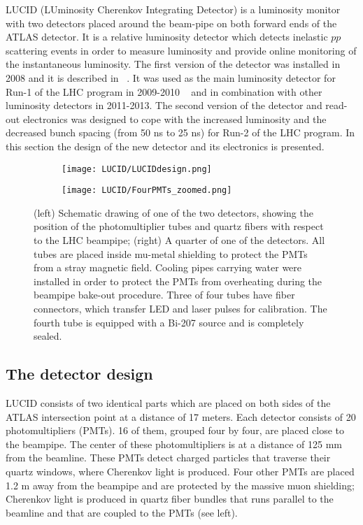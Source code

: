 LUCID (LUminosity Cherenkov Integrating Detector) is a luminosity monitor with two detectors placed around the beam-pipe on both forward ends of the ATLAS detector.
It is a relative luminosity detector which detects inelastic $pp$ scattering events in order to measure luminosity and provide online monitoring of the instantaneous luminosity.
The first version of the detector was installed in 2008 and it is described in ~\cite{Aad:2008zzm}.
It was used as the main luminosity detector for Run-1 of the LHC program in 2009-2010 ~\cite{Aad:2013ucp} and in combination with other luminosity detectors in 2011-2013.
The second version of the detector and read-out electronics was designed to cope with 
the increased luminosity and the decreased bunch spacing (from 50 ns to 25 ns) for Run-2 of the LHC program.
In this section the design of the new detector and its electronics is presented. 

\begin{figure}
\centering
\begin{subfigure}{.5\textwidth}
  \centering
  \texttt{[image: LUCID/LUCIDdesign.png]}
\end{subfigure}%
\begin{subfigure}{.5\textwidth}
  \centering
  \texttt{[image: LUCID/FourPMTs\_zoomed.png]}
\end{subfigure}
\caption{(left) Schematic drawing of one of the two detectors, showing the position of the photomultiplier tubes 
and quartz fibers with respect to the LHC beampipe; (right) A quarter of one of the detectors. All tubes are 
placed inside mu-metal shielding to protect the PMTs from a stray magnetic field. Cooling pipes carrying water were installed in order 
to protect the PMTs from overheating during the beampipe bake-out procedure. Three of four tubes have fiber connectors, which
transfer LED and laser pulses for calibration. The fourth tube is equipped with a Bi-207 source and is completely 
sealed.}
\label{fig:LucidDrawing}
\end{figure}

\subsection{The detector design}
\label{subsec:newLucidDesign}

LUCID consists of two identical parts which are placed on both sides of the ATLAS intersection point at a distance of 17 meters.
Each detector consists of 20 photomultipliers (PMTs).
16 of them, grouped four by four, are placed close to the beampipe. The center of these photomultipliers is at a distance of 125 mm from the beamline.
These PMTs detect charged particles that traverse their quartz windows, where Cherenkov light is produced.
Four other PMTs are placed 1.2 m away from the beampipe and are protected by the massive muon shielding; 
Cherenkov light is produced in quartz fiber bundles that runs parallel to the beamline and that are coupled to the PMTs (see  left).

